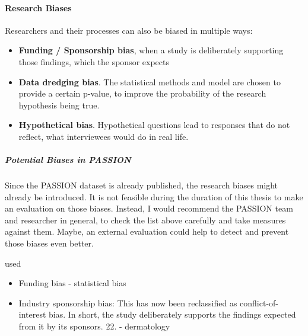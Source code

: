 \begin{refsection}
\begin{itemize}
			\rawcitationusedend
		\end{itemize}
		\rawcitationend
		
		\paragraph{Research Biases}
		Researchers and their processes can also be biased in multiple ways:
		\begin{itemize}
			\item \textbf{Funding / Sponsorship bias}, when a study is deliberately supporting those findings, which the sponsor expects \autocites{Chakraborty_2024, c22}{Mester_2017}
			
			\item \textbf{Data dredging bias}. The statistical methods and model are chosen to provide a certain p-value, to improve the probability of the research hypothesis being true.  \autocite{Chakraborty_2024}
			
			\item \textbf{Hypothetical bias}. Hypothetical questions lead to responses that do not reflect, what interviewees would do in real life. \autocite{Chakraborty_2024, c31, c28} 
		\end{itemize}
		
		\subparagraph{Potential Biases in PASSION}
		Since the PASSION dataset is already published, the research biases might already be introduced. It is not feasible during the duration of this thesis to make an evaluation on those biases. Instead, I would recommend the PASSION team and researcher in general, to check the list above carefully and take measures against them. Maybe, an external evaluation could help to detect and prevent those biases even better.
		
		
		
		\rawcitationstart
		used
		\begin{itemize}		
			\rawcitationusedstart
			\item Funding bias \autocites{Mester_2022}{Mester_2017} - statistical bias
			\item  Industry sponsorship bias: This has now been reclassified as conflict-of-interest bias. In short, the study deliberately supports the findings expected from it by its sponsors. 22.\autocite{Chakraborty_2024} - dermatology
			

\end{itemize}
\end{refsection}
